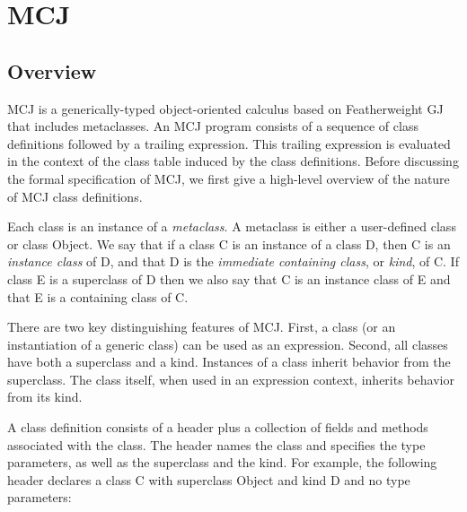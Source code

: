 \documentclass{acm-sigplan}
\begin{document}

\section{MCJ}
\label{MCJ}

\subsection{Overview}

\label{MCJintro}

MCJ is a generically-typed object-oriented calculus based on
Featherweight GJ that includes metaclasses. An MCJ program consists of
a sequence of class definitions followed by a trailing
expression. This trailing expression is evaluated in the context of
the class table induced by the class definitions.  Before discussing
the formal specification of MCJ, we first give a high-level overview
of the nature of MCJ class definitions.

Each class is an instance of a \emph{metaclass}.  A metaclass is
either a user-defined class or class {\txt Object}.  We say that if a
class {\txt C} is an instance of a class {\txt D}, then {\txt C} is an
\emph{instance class} of {\txt D}, and that {\txt D} is the
\emph{immediate containing class}, or \emph{kind}, of {\txt C}.  If
class {\txt E} is a superclass of {\txt D} then we also say that {\txt
C} is an instance class of {\txt E} and that {\txt E} is a containing
class of {\txt C}.

There are two key distinguishing features of MCJ. First, a class (or
an instantiation of a generic class) can be used as an expression.
Second, all classes have both a superclass and a kind. Instances of a
class inherit behavior from the superclass. The class itself, when
used in an expression context, inherits behavior from its kind.

A class definition consists of a header plus a collection of fields
and methods associated with the class.  The header names the class and
specifies the type parameters, as well as the superclass and the kind.
For example, the following header declares a class {\txt C} with
superclass {\txt Object} and kind {\txt D} and no type parameters:
\end{document}
